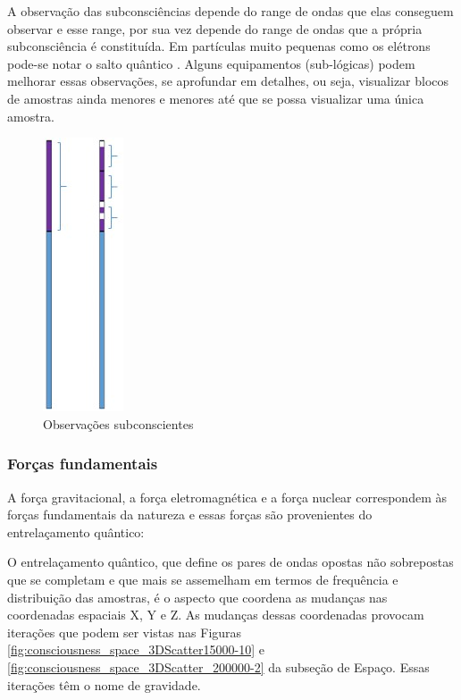 A observação das subconsciências depende do range de ondas que elas conseguem observar e esse range, por sua vez depende do range de ondas que a própria subconsciência é constituída. Em partículas muito pequenas como os elétrons pode-se notar o salto quântico \cite{universoracionalista_salto_quanticos}. Alguns equipamentos (sub-lógicas) podem melhorar essas observações, se aprofundar em detalhes, ou seja, visualizar blocos de amostras ainda menores e menores até que se possa visualizar uma única amostra.  
\begin{figure}[H]
\caption{Observações subconscientes}
\label{fig:consciousness_space_subconscious_observation}
\centering
\includegraphics[scale=.9]{sections/images/consciousness_space_subconscious_observation.jpg}
\end{figure}

\subsubsection{Forças fundamentais}
A força gravitacional, a força eletromagnética e a força nuclear correspondem às forças fundamentais da natureza e essas forças são provenientes do entrelaçamento quântico:

O entrelaçamento quântico, que define os pares de ondas opostas não sobrepostas que se completam e que mais se assemelham em termos de frequência e distribuição das amostras, é o aspecto que coordena as mudanças nas coordenadas espaciais X, Y e Z. As mudanças dessas coordenadas provocam iterações que podem ser vistas nas Figuras \ref{fig:consciousness_space_3DScatter15000-10} e \ref{fig:consciousness_space_3DScatter_200000-2} da subseção de Espaço. Essas iterações têm o nome de gravidade.

